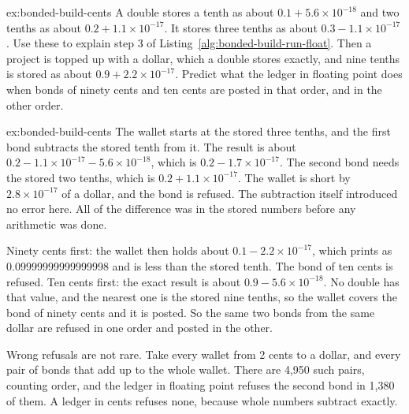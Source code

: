 \documentclass[11pt,a4paper]{article}
\theoremstyle{definition}
\theoremstyle{remark}
\begin{document}
\begin{pdexercise}[kind=Trace,rating=2]{ex:bonded-build-cents}
A double stores a tenth as about $0.1+5.6\times10^{-18}$ and two tenths as about $0.2+1.1\times10^{-17}$. It stores three tenths as about $0.3-1.1\times10^{-17}$. Use these to explain step 3 of Listing~\ref{alg:bonded-build-run-float}. Then a project is topped up with a dollar, which a double stores exactly, and nine tenths is stored as about $0.9+2.2\times10^{-17}$. Predict what the ledger in floating point does when bonds of ninety cents and ten cents are posted in that order, and in the other order.
\end{pdexercise}
\begin{pdsolution}{ex:bonded-build-cents}
The wallet starts at the stored three tenths, and the first bond subtracts the stored tenth from it. The result is about $0.2-1.1\times10^{-17}-5.6\times10^{-18}$, which is $0.2-1.7\times10^{-17}$. The second bond needs the stored two tenths, which is $0.2+1.1\times10^{-17}$. The wallet is short by $2.8\times10^{-17}$ of a dollar, and the bond is refused. The subtraction itself introduced no error here. All of the difference was in the stored numbers before any arithmetic was done.

Ninety cents first: the wallet then holds about $0.1-2.2\times10^{-17}$, which prints as 0.09999999999999998 and is less than the stored tenth. The bond of ten cents is refused. Ten cents first: the exact result is about $0.9-5.6\times10^{-18}$. No double has that value, and the nearest one is the stored nine tenths, so the wallet covers the bond of ninety cents and it is posted. So the same two bonds from the same dollar are refused in one order and posted in the other.

Wrong refusals are not rare. Take every wallet from 2 cents to a dollar, and every pair of bonds that add up to the whole wallet. There are 4,950 such pairs, counting order, and the ledger in floating point refuses the second bond in 1,380 of them. A ledger in cents refuses none, because whole numbers subtract exactly.
\end{pdsolution}
\end{document}
